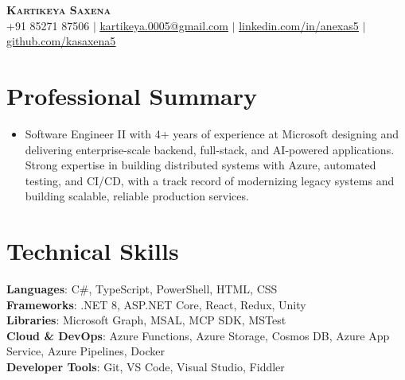 \documentclass[letterpaper,11pt]{article}
\begin{document}

\begin{center}
    \textbf{\Huge \scshape Kartikeya Saxena} \\ \vspace{1pt}
    \small +91 85271 87506 $|$ \href{mailto:kartikeya.0005@gmail.com}{\underline{kartikeya.0005@gmail.com}} $|$ 
    \href{https://linkedin.com/in/anexas5}{\underline{linkedin.com/in/anexas5}} $|$
    \href{https://github.com/kasaxena5}{\underline{github.com/kasaxena5}}
\end{center}

\section{Professional Summary}
\begin{itemize}[leftmargin=0.15in, label={}]
\item{Software Engineer II with 4+ years of experience at Microsoft designing and delivering enterprise-scale backend, full-stack, and AI-powered applications. Strong expertise in building distributed systems with Azure, automated testing, and CI/CD, with a track record of modernizing legacy systems and building scalable, reliable production services.
}
\end{itemize}

\section{Technical Skills}
 \begin{itemize}[leftmargin=0.15in, label={}]
    \small{\item{
      \textbf{Languages}{: C\#, TypeScript, PowerShell, HTML, CSS} \\
     \textbf{Frameworks}{: .NET 8, ASP.NET Core, React, Redux, Unity} \\
     \textbf{Libraries}{: Microsoft Graph, MSAL, MCP SDK, MSTest} \\
     \textbf{Cloud \& DevOps}{: Azure Functions, Azure Storage, Cosmos DB, Azure App Service, Azure Pipelines, Docker} \\
     \textbf{Developer Tools}{: Git, VS Code, Visual Studio, Fiddler}
    }}
 \end{itemize}
\end{document}
